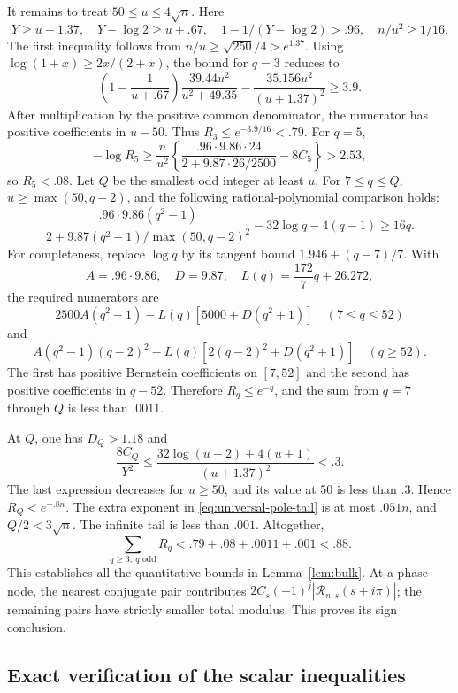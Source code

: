 It remains to treat $50\le u\le4\sqrt n$. Here
\[
 Y\ge u+1.37,\quad Y-\log2\ge u+.67,\quad
 1-1/(Y-\log2)>.96,\quad n/u^2\ge1/16.
\]
The first inequality follows from
$n/u\ge\sqrt{250}/4>e^{1.37}$. Using
$\log(1+x)\ge2x/(2+x)$, the bound for $q=3$ reduces to
\begin{equation}\label{eq:negative-rational-polynomial}
 \left(1-\frac1{u+.67}\right)
       \frac{39.44u^2}{u^2+49.35}
 -\frac{35.156u^2}{(u+1.37)^2}\ge3.9.
\end{equation}
After multiplication by the positive common denominator, the
numerator has positive coefficients in $u-50$. Thus
$R_3\le e^{-3.9/16}<.79$.
For $q=5$,
\[
 -\log R_5\ge\frac n{u^2}
 \left\{\frac{.96\cdot9.86\cdot24}
 {2+9.87\cdot26/2500}-8C_5\right\}>2.53,
\]
so $R_5<.08$.
Let $Q$ be the smallest odd integer at least $u$. For $7\le q\le Q$,
$u\ge\max(50,q-2)$, and the following rational-polynomial comparison
holds:
\[
 \frac{.96\cdot9.86(q^2-1)}
 {2+9.87(q^2+1)/\max(50,q-2)^2}
 -32\log q-4(q-1)\ge16q.
\]
For completeness, replace $\log q$ by its tangent bound
$1.946+(q-7)/7$. With
\[
 A=.96\cdot9.86,\quad D=9.87,\quad
 L(q)=\frac{172}{7}q+26.272,
\]
the required numerators are
\[
 2500A(q^2-1)-L(q)[5000+D(q^2+1)]\quad(7\le q\le52)
\]
and
\[
 A(q^2-1)(q-2)^2
 -L(q)[2(q-2)^2+D(q^2+1)]\quad(q\ge52).
\]
The first has positive Bernstein coefficients on $[7,52]$ and the
second has positive coefficients in $q-52$. Therefore $R_q\le e^{-q}$,
and the sum from $q=7$ through $Q$ is less than $.0011$.

At $Q$, one has $D_Q>1.18$ and
\[
 \frac{8C_Q}{Y^2}
 \le\frac{32\log(u+2)+4(u+1)}{(u+1.37)^2}<.3.
\]
The last expression decreases for $u\ge50$, and its value at $50$
is less than $.3$. Hence $R_Q<e^{-.8n}$. The extra exponent in
\eqref{eq:universal-pole-tail} is at most $.051n$, and
$Q/2<3\sqrt n$. The infinite tail is less than $.001$.
Altogether,
\[
 \sum_{q\ge3,\ q\text{ odd}}R_q
 <.79+.08+.0011+.001<.88.
\]
This establishes all the quantitative bounds in Lemma~\ref{lem:bulk}.
At a phase node, the nearest conjugate pair contributes
$2C_s(-1)^j|\mathcal R_{n,s}(s+i\pi)|$; the remaining pairs have
strictly smaller total modulus. This proves its sign conclusion.

\subsection{Exact verification of the scalar inequalities}

